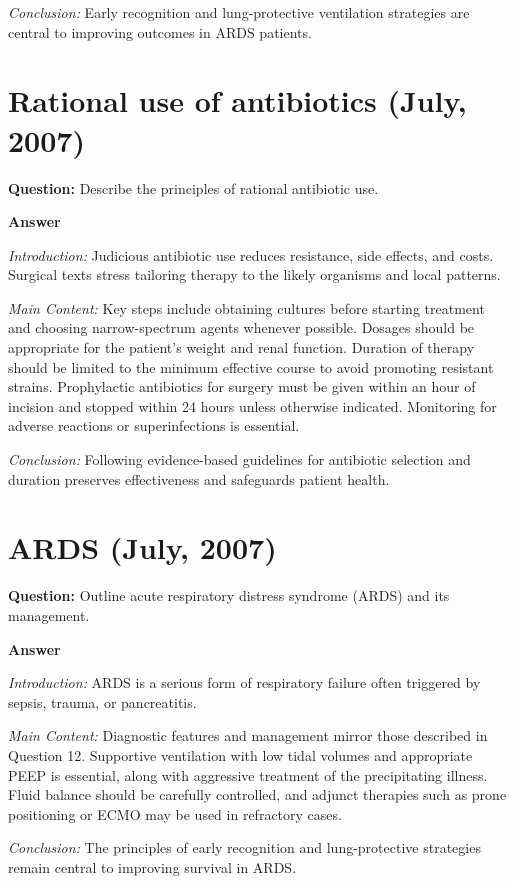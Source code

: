 \documentclass{article}
\begin{document}
\emph{Conclusion:} Early recognition and lung-protective ventilation strategies are central to improving outcomes in ARDS patients.


\section{Rational use of antibiotics (July, 2007)}


\textbf{Question:} Describe the principles of rational antibiotic use.

\textbf{Answer}

\emph{Introduction:} Judicious antibiotic use reduces resistance, side effects, and costs. Surgical texts stress tailoring therapy to the likely organisms and local patterns.

\emph{Main Content:} Key steps include obtaining cultures before starting treatment and choosing narrow-spectrum agents whenever possible. Dosages should be appropriate for the patient's weight and renal function. Duration of therapy should be limited to the minimum effective course to avoid promoting resistant strains. Prophylactic antibiotics for surgery must be given within an hour of incision and stopped within 24 hours unless otherwise indicated. Monitoring for adverse reactions or superinfections is essential.

\emph{Conclusion:} Following evidence-based guidelines for antibiotic selection and duration preserves effectiveness and safeguards patient health.


\section{ARDS (July, 2007)}


\textbf{Question:} Outline acute respiratory distress syndrome (ARDS) and its management.

\textbf{Answer}

\emph{Introduction:} ARDS is a serious form of respiratory failure often triggered by sepsis, trauma, or pancreatitis.

\emph{Main Content:} Diagnostic features and management mirror those described in Question 12. Supportive ventilation with low tidal volumes and appropriate PEEP is essential, along with aggressive treatment of the precipitating illness. Fluid balance should be carefully controlled, and adjunct therapies such as prone positioning or ECMO may be used in refractory cases.

\emph{Conclusion:} The principles of early recognition and lung-protective strategies remain central to improving survival in ARDS.
\end{document}
